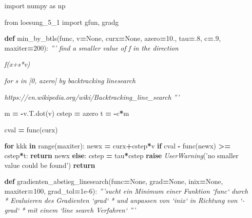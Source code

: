 \documentclass[]{book}
\newenvironment{Shaded}{\begin{snugshade}}{\end{snugshade}}
\newcommand{\BuiltInTok}[1]{#1}
\newcommand{\CommentTok}[1]{\textcolor[rgb]{0.56,0.35,0.01}{\textit{#1}}}
\newcommand{\ControlFlowTok}[1]{\textcolor[rgb]{0.13,0.29,0.53}{\textbf{#1}}}
\newcommand{\DecValTok}[1]{\textcolor[rgb]{0.00,0.00,0.81}{#1}}
\newcommand{\FloatTok}[1]{\textcolor[rgb]{0.00,0.00,0.81}{#1}}
\newcommand{\ImportTok}[1]{#1}
\newcommand{\KeywordTok}[1]{\textcolor[rgb]{0.13,0.29,0.53}{\textbf{#1}}}
\newcommand{\NormalTok}[1]{#1}
\newcommand{\OperatorTok}[1]{\textcolor[rgb]{0.81,0.36,0.00}{\textbf{#1}}}
\newcommand{\PreprocessorTok}[1]{\textcolor[rgb]{0.56,0.35,0.01}{\textit{#1}}}
\newcommand{\StringTok}[1]{\textcolor[rgb]{0.31,0.60,0.02}{#1}}
\newcommand{\VariableTok}[1]{\textcolor[rgb]{0.00,0.00,0.00}{#1}}
\theoremstyle{definition}
\theoremstyle{definition}
\theoremstyle{definition}
\theoremstyle{definition}
\theoremstyle{remark}
\begin{document}
\begin{Shaded}
\begin{Highlighting}[]
\ImportTok{import}\NormalTok{ numpy }\ImportTok{as}\NormalTok{ np}

\ImportTok{from}\NormalTok{ loesung_5_1 }\ImportTok{import}\NormalTok{ gfun, gradg}


\KeywordTok{def}\NormalTok{ min_by_btls(func, v}\OperatorTok{=}\VariableTok{None}\NormalTok{, curx}\OperatorTok{=}\VariableTok{None}\NormalTok{,}
\NormalTok{                azero}\OperatorTok{=}\FloatTok{10.}\NormalTok{, tau}\OperatorTok{=}\NormalTok{.}\DecValTok{8}\NormalTok{, c}\OperatorTok{=}\NormalTok{.}\DecValTok{9}\NormalTok{, maxiter}\OperatorTok{=}\DecValTok{200}\NormalTok{):}
    \CommentTok{''' find a smaller value of f in the direction}

\CommentTok{    f(x+s*v)}

\CommentTok{    for s in [0, azero]}
\CommentTok{    by backtracking linesearch}

\CommentTok{    https://en.wikipedia.org/wiki/Backtracking_line_search}
\CommentTok{    '''}

\NormalTok{    m }\OperatorTok{=} \OperatorTok{-}\NormalTok{v.T.dot(v)}
\NormalTok{    cstep }\OperatorTok{=}\NormalTok{ azero}
\NormalTok{    t }\OperatorTok{=} \OperatorTok{-}\NormalTok{c}\OperatorTok{*}\NormalTok{m}

\NormalTok{    cval }\OperatorTok{=}\NormalTok{ func(curx)}

    \ControlFlowTok{for}\NormalTok{ kkk }\KeywordTok{in} \BuiltInTok{range}\NormalTok{(maxiter):}
\NormalTok{        newx }\OperatorTok{=}\NormalTok{ curx}\OperatorTok{+}\NormalTok{cstep}\OperatorTok{*}\NormalTok{v}
        \ControlFlowTok{if}\NormalTok{ cval }\OperatorTok{-}\NormalTok{ func(newx) }\OperatorTok{>=}\NormalTok{ cstep}\OperatorTok{*}\NormalTok{t:}
            \ControlFlowTok{return}\NormalTok{ newx}
        \ControlFlowTok{else}\NormalTok{:}
\NormalTok{            cstep }\OperatorTok{=}\NormalTok{ tau}\OperatorTok{*}\NormalTok{cstep}
    \ControlFlowTok{raise} \PreprocessorTok{UserWarning}\NormalTok{(}\StringTok{'no smaller value could be found'}\NormalTok{)}
    \ControlFlowTok{return}


\KeywordTok{def}\NormalTok{ gradienten_abstieg_linesearch(func}\OperatorTok{=}\VariableTok{None}\NormalTok{, grad}\OperatorTok{=}\VariableTok{None}\NormalTok{, inix}\OperatorTok{=}\VariableTok{None}\NormalTok{,}
\NormalTok{                                  maxiter}\OperatorTok{=}\DecValTok{100}\NormalTok{, grad_tol}\OperatorTok{=}\FloatTok{1e-6}\NormalTok{):}
    \CommentTok{'''sucht ein Minimum einer Funktion `func` durch}
\CommentTok{     * Evaluieren des Gradienten `grad`}
\CommentTok{     * und anpassen von `inix` in Richtung von `-grad`}
\CommentTok{     * mit einem `line search Verfahren`}
\CommentTok{    '''}


\end{Highlighting}
\end{Shaded}
\end{document}
